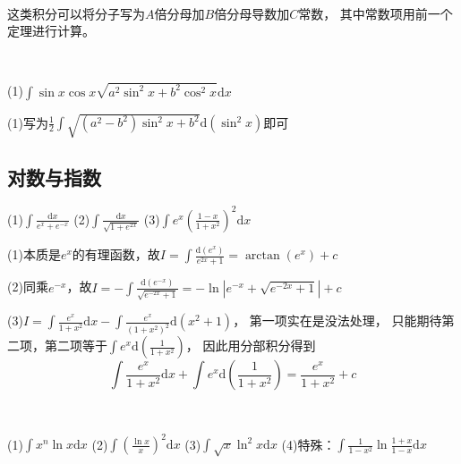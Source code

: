 ~

\begin{corollary}
  这类积分可以将分子写为$A$倍分母加$B$倍分母导数加$C$常数，
  其中常数项用前一个定理进行计算。
\end{corollary}

~

\begin{exercise}[三角根号]
  (1)$\int \sin x \cos x \sqrt{a^2 \sin^2 x + b^2 \cos ^2 x}\mathrm{d} x$
\end{exercise}

\begin{solution}
  (1)写为$\frac{1}{2}\int \sqrt{(a^2 - b^2)\sin^2 x + b^2}\mathrm{d}(\sin^2 x)$即可
\end{solution}

\subsection{对数与指数}

\begin{exercise}[几道经典指数积分]
  (1)$\int \frac{\mathrm{d}x}{e^x + e^{-x}}$
  (2)$\int \frac{\mathrm{d} x}{\sqrt{1 + e^{2x}}}$
  (3)$\int e^x \left( \frac{1-x}{1+x^2} \right)^2 \mathrm{d} x$
\end{exercise}

\begin{solution}
  (1)本质是$e^x$的有理函数，故$I = \int \frac{\mathrm{d}(e^x)}{e^{2x} + 1} = \arctan (e^x) + c$

  (2)同乘$e^{-x}$，故$I = -\int \frac{\mathrm{d}(e^{-x})}{\sqrt{e^{-2x} + 1}} = - \ln |e^{-x} + \sqrt{e^{-2x} + 1}| + c$

  (3)$I = \int \frac{e^x}{1+x^2}\mathrm{d} x - \int \frac{e^x}{(1 + x^2)^2}\mathrm{d} (x^2 + 1)$，
  第一项实在是没法处理，
  只能期待第二项，第二项等于$\int e^x \mathrm{d}(\frac{1}{1+x^2})$，
  因此用分部积分得到
  \begin{equation*}
    \int \frac{e^x}{1 + x^2}\mathrm{d} x + \int e^x \mathrm{d}(\frac{1}{1+x^2}) = \frac{e^x}{1 + x^2} + c
  \end{equation*}
\end{solution}

~

\begin{exercise}[几道经典对数积分]
  (1)$\int x^n \ln x \mathrm{d} x$
  (2)$\int \left( \frac{\ln x}{x} \right)^2 \mathrm{d} x$
  (3)$\int \sqrt{x} \ln^2 x \mathrm{d} x$
  (4)特殊：$\int \frac{1}{1-x^2} \ln \frac{1+x}{1-x}\mathrm{d} x$
\end{exercise}

